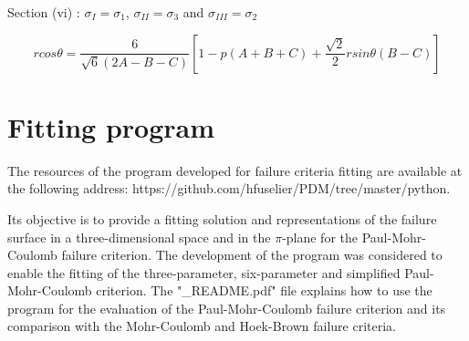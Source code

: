 Section (vi) : $\sigma_I = \sigma_1$, $\sigma_{II} = \sigma_3$ and $\sigma_{III} = \sigma_2$

\begin{equation}
    r cos\theta = \frac{6}{\sqrt{6}(2A-B-C)} \left[ 1-p(A+B+C)+ \frac{\sqrt{2}}{2} r sin \theta (B-C) \right]
\end{equation}


\chapter{Fitting program}\label{App:C}

The resources of the program developed for failure criteria fitting are available at the following address: https://github.com/hfuselier/PDM/tree/master/python.

Its objective is to provide a fitting solution and representations of the failure surface in a three-dimensional space and in the $\pi$-plane for the Paul-Mohr-Coulomb failure criterion. The development of the program was considered to enable the fitting of the three-parameter, six-parameter and simplified Paul-Mohr-Coulomb criterion. The "\_README.pdf" file explains how to use the program for the evaluation  of the Paul-Mohr-Coulomb failure criterion and its comparison with the Mohr-Coulomb and Hoek-Brown failure criteria. 

